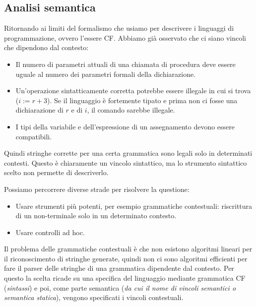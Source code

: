 \documentclass[oneside,a4paper,11pt]{book}
\theoremstyle{italicstyle}
\theoremstyle{normStyle}
\begin{document}
\subsection{Analisi semantica}
Ritornando ai limiti del formalismo che usiamo per descrivere i linguaggi di 
programmazione, ovvero l'essere CF. Abbiamo già osservato che ci siano vincoli 
che dipendono dal contesto:
\begin{itemize}
  \item Il numero di parametri attuali di una chiamata di procedura deve essere 
  uguale al numero dei parametri formali della dichiarazione.
  \item Un'operazione sintatticamente corretta potrebbe essere illegale in 
  cui si trova ($i := r + 3$). Se il linguaggio è fortemente tipato e prima non 
  ci fosse una dichiarazione di $r$ e di $i$, il comando sarebbe illegale.
  \item I tipi della variabile e dell'espressione di un assegnamento devono 
  essere compatibili.
\end{itemize}
Quindi stringhe corrette per una certa grammatica sono legali solo in 
determinati contesti. Questo è chiaramente un vincolo sintattico, ma lo strumento
sintattico scelto non permette di descriverlo.

Possiamo percorrere diverse strade per risolvere la questione:
\begin{itemize}
  \item Usare strumenti più potenti, per esempio grammatiche contestuali:
  riscrittura di un non-terminale solo in un determinato contesto.
  \item Usare controlli ad hoc.
\end{itemize}
Il problema delle grammatiche contestuali è che non esistono algoritmi lineari per 
il riconoscimento di stringhe generate, quindi non ci sono algoritmi efficienti 
per fare il parser delle stringhe di una grammatica dipendente dal contesto.
Per questo la scelta ricade su una specifica del linguaggio mediante grammatica 
CF (\textit{sintassi}) e poi, come parte semantica (\textit{da cui il nome di 
vincoli semantici o semantica statica}), vengono specificati i vincoli contestuali.
\end{document}
